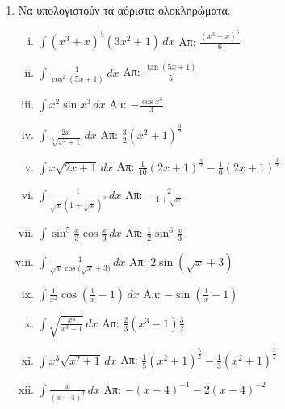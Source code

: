 \documentclass[a4paper,table]{report}
\begin{document}
\begin{enumerate}
  \item Να υπολογιστούν τα αόριστα ολοκληρώματα.
    \begin{enumerate}[i)]
      \item $ \int (x^{3} + x)^{5}(3x^{2} + 1) \,{dx} $ 
        \hfill Απ: $ \frac{ (x^{3} + x)^{6} }{ 6}  $
      \item $ \int \frac{ 1 }{ \cos^{2}{ (5x + 1)} } \,{dx} $ 
        \hfill Απ: $ \frac{\tan{(5x+1)}}{5} $
      \item $ \int x^{2} \sin{x^{3}} \,{dx} $ \hfill Απ: $ - \frac{ \cos{x^{3}}}{ 3 }  $
      \item $ \int \frac{ 2x }{ \sqrt[3]{ x^{2}+ 1 }  } \,{dx} $ 
        \hfill Απ: $ \frac{ 3 }{ 2 } (x^{2} + 1)^{\frac{ 3 }{ 2 }} $
      \item $ \int x \sqrt{ 2x+1 } \,{dx} $ 
        \hfill Απ: $ \frac{1}{ 10 } (2x+1)^{\frac{ 5 }{ 2 }} - 
        \frac{1}{ 6 } (2x+1)^{\frac{ 3 }{ 2 }} $
      \item $ \int \frac{1}{ \sqrt{ x } (1 + \sqrt{ x })^{2} } \,{dx} $ 
        \hfill Απ: $ - \frac{ 2 }{ 1 + \sqrt{ x } } $
      \item $ \int \sin^{5}{\frac{ x }{ 3 } \cos{\frac{ x }{ 3 } }} \,{dx} $ 
        \hfill Απ: $ \frac{1}{ 2 } \sin^{6}{\frac{ x }{ 3 }} $
      \item $ \int \frac{1}{ \sqrt{ x } \cos{(\sqrt{ x } + 3}) } \,{dx} $ 
        \hfill Απ: $ 2 \sin{(\sqrt{ x } + 3)} $
      \item $ \int \frac{1}{ x^{2} } \cos{\left(\frac{1}{ x } - 1\right)} \,{dx} $ 
        \hfill Απ: $ - \sin{\left(\frac{1}{ x } -1\right)} $
      \item $ \int \sqrt{ \frac{ x^{4} }{ x^{3} -1 }  }  \,{dx} $ 
        \hfill Απ: $ \frac{ 2 }{ 3 } (x^{3} - 1){\frac{ 3 }{ 2 }} $
      \item $ \int x^{3} \sqrt{ x^{2} +1}  \,{dx} $ 
        \hfill Απ: $ \frac{ 1 }{ 5 } (x^{2}+1)^{\frac{ 5 }{ 2 }} - 
        \frac{1}{ 3 } (x^{2} + 1)^{\frac{ 3 }{ 2 }}  $
      \item $ \int \frac{ x }{ (x-4)^{3} } \,{dx} $ 
        \hfill Απ: $ -(x-4)^{-1} - 2(x-4)^{-2} $
    \end{enumerate}
\end{enumerate}
\end{document}
